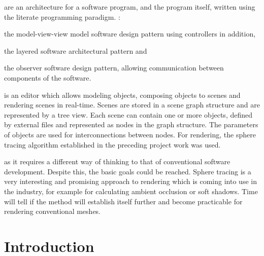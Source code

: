 \documentclass[%
    a4paper,    %
    justified,  %
    nobib,      %
    openany     %
]{tufte-book}
\makeatletter
\renewcommand{\label}[1]{\@tufte@label{##1}}%
\makeatother
\begin{document}
 are an architecture for a software
program, and the program itself, written using the literate programming
paradigm.
:
\begin{enumerate*}
  \item the model-view-view model software design pattern using controllers in
    addition,
  \item the layered software architectural pattern and
  \item the observer software design pattern, allowing communication between
    components of the software.
\end{enumerate*}

 is an editor which allows modeling objects,
composing objects to scenes and rendering scenes in real-time. Scenes are stored
in a scene graph structure and are represented by a tree view. Each scene can
contain one or more objects, defined by external files and represented as nodes
in the graph structure. The parameters of objects are used for interconnections
between nodes. For rendering, the sphere tracing algorithm established in the
preceding project work was used.

 as it requires a
different way of thinking to that of conventional software development. Despite
this, the basic goals could be reached. Sphere tracing is a very interesting and
promising approach to rendering which is coming into use in the industry, for
example for calculating ambient occlusion or soft shadows. Time will tell if the
method will establish itself further and become practicable for rendering
conventional meshes.
\tableofcontents{}
\listoffigures{}
\listoftables{}

\newpage{}

\chapter{Introduction}
\label{chap:introduction}
\end{document}
